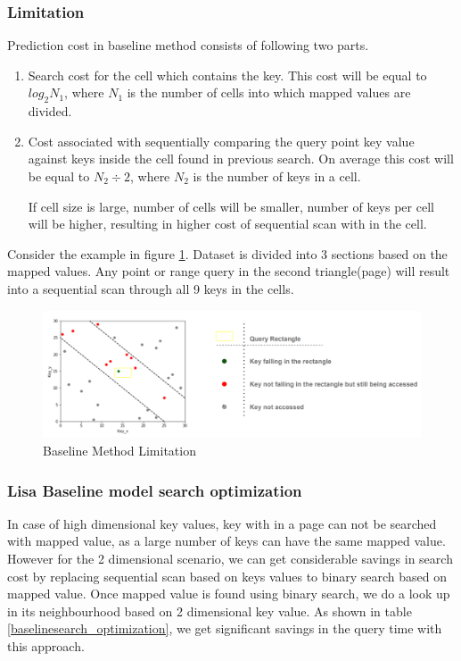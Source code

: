 \subsubsection{Limitation}

Prediction cost in baseline method consists of following two parts.

\begin{enumerate}
	\item Search cost for the cell which contains the key. This cost will be equal to $log_{2}N_{1}$, where $N_{1}$ is the number of cells into which mapped values are divided.
	
	\item Cost associated with sequentially comparing the query point key value against keys inside the cell found in previous search. On average this cost will be equal to $N_{2}\div2$, where $N_{2}$ is the number of keys in a cell.   
	
If cell size is large, number of cells will be smaller, number of keys per cell will be higher, resulting in higher cost of sequential scan with in the cell. 
\end{enumerate}
Consider the example in figure \ref{fig:BaseLine_Method_Limitation}. Dataset is divided into 3 sections based on the mapped values. Any point or range query in the second triangle(page) will result into a sequential scan through all 9 keys in the cells.

\begin{figure}[t]
    \centering
    \includegraphics[width=1\textwidth]{graphs/Lisa_Baseline_Model_Limitation.png}
    \caption{Baseline Method Limitation }
    \label{fig:BaseLine_Method_Limitation}
\end{figure}



\subsubsection {Lisa Baseline model search optimization}
In case of high dimensional key values, key with in a page can not be searched with mapped value, as a large number of keys can have the same mapped value. However for the 2 dimensional scenario, we can get considerable savings in search cost by replacing sequential scan based on keys values to binary search based on mapped value. Once mapped value is found using binary search, we do a look up in its neighbourhood based on 2 dimensional key value. As shown in table \ref{baselinesearch_optimization}, we get significant savings in the query time with this approach.

